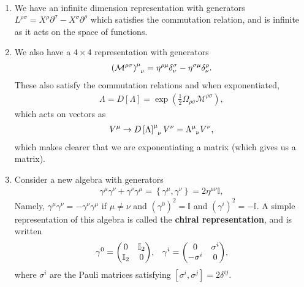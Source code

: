 \begin{examples}~
    \begin{enumerate}[label=\arabic*)]
        \item We have an infinite dimension representation with generators $L^{\rho \sigma} = X^{\rho} \partial^{\sigma} - X^{\sigma} \partial^{\rho}$ which satisfies the commutation relation, and is infinite as it acts on the space of functions.
        \item We also have a $4 \times 4$ representation with generators
            \begin{align}
            \tensor{\left( \mathcal{M}^{\rho \sigma} \right)}{^{\mu}_\nu} = \eta^{\rho \mu} \delta^{\sigma}_\nu - \eta^{\sigma \mu} \delta^{\rho}_\nu
            .\end{align}
            These also satisfy the commutation relations and when exponentiated,
            \begin{align}
                \Lambda = D \left[ \Lambda \right] = \exp \left( \frac{1}{2}\Omega_{\rho \sigma} \mathcal{M}^{\rho \sigma} \right) 
            ,\end{align}
            which acts on vectors as
            \begin{align}
                V^{\mu} \to \tensor{D\left[ \Lambda \right] }{^{\mu}_\nu} V^{\nu} = \tensor{\Lambda}{^{\mu}_\nu} V^{\nu}
            ,\end{align}
            which makes clearer that we are exponentiating a matrix (which gives us a matrix).
        \item Consider a new algebra with generators
            \begin{align}
                \gamma^{\mu} \gamma^{\nu} + \gamma^{\nu} \gamma^{\mu} = \left\{ \gamma^{\mu}, \gamma^{\nu} \right\} = 2 \eta^{\mu \nu} \mathbb{I}
            ,\end{align}
            Namely, $\gamma^{\mu} \gamma^{\nu} = -\gamma^{\nu} \gamma^{\mu}$ if $\mu \neq \nu$ and $\left( \gamma^0 \right)^2 = \mathbb{I}$ and $\left( \gamma^{i} \right)^2 = - \mathbb{I}$. A simple representation of this algebra is called the \textbf{chiral representation}, and is written
            \begin{align}
                \gamma^{0} = \mqty( 0 & \mathbb{I}_2 \\ \mathbb{I}_2 & 0 ), && \gamma^{i} = \mqty( 0 & \sigma^{i} \\ -\sigma^{i} & 0 )
            ,\end{align}
            where $\sigma^{i}$ are the Pauli matrices satisfying $\left[ \sigma^{i}, \sigma^{j} \right] = 2\delta^{ij}$.


\end{enumerate}
\end{examples}
